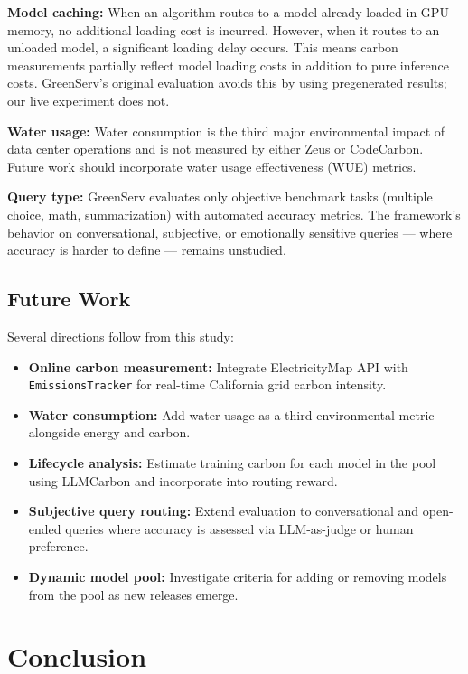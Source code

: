 \documentclass[12pt]{article}
\begin{document}
\textbf{Model caching:} When an algorithm routes to a model already loaded
in GPU memory, no additional loading cost is incurred. However, when it
routes to an unloaded model, a significant loading delay occurs. This means
carbon measurements partially reflect model loading costs in addition to
pure inference costs. GreenServ's original evaluation avoids this by using
pregenerated results; our live experiment does not.

\textbf{Water usage:} Water consumption is the third major environmental
impact of data center operations and is not measured by either Zeus or
CodeCarbon. Future work should incorporate water usage effectiveness (WUE)
metrics.

\textbf{Query type:} GreenServ evaluates only objective benchmark tasks
(multiple choice, math, summarization) with automated accuracy metrics. The
framework's behavior on conversational, subjective, or emotionally sensitive
queries --- where accuracy is harder to define --- remains unstudied.

\subsection{Future Work}

Several directions follow from this study:

\begin{itemize}
  \item \textbf{Online carbon measurement:} Integrate ElectricityMap API
  with \texttt{EmissionsTracker} for real-time California grid carbon
  intensity.
  \item \textbf{Water consumption:} Add water usage as a third environmental
  metric alongside energy and carbon.
  \item \textbf{Lifecycle analysis:} Estimate training carbon for each model
  in the pool using LLMCarbon \cite{faiz2023llmcarbon} and incorporate into
  routing reward.
  \item \textbf{Subjective query routing:} Extend evaluation to
  conversational and open-ended queries where accuracy is assessed via
  LLM-as-judge or human preference.
  \item \textbf{Dynamic model pool:} Investigate criteria for adding or
  removing models from the pool as new releases emerge.
\end{itemize}

\section{Conclusion}
\end{document}
